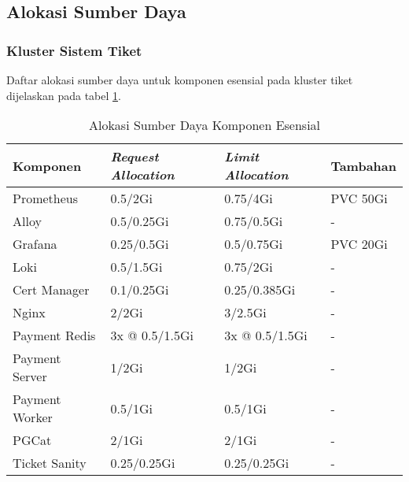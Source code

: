 \subsection{Alokasi Sumber Daya}

\subsubsection{Kluster Sistem Tiket}

Daftar alokasi sumber daya untuk komponen esensial pada kluster tiket dijelaskan pada tabel \ref{tab:resource_allocation}.

\begin{table}[htpb]
    \centering
    \caption{Alokasi Sumber Daya Komponen Esensial}
    \label{tab:resource_allocation}
    \begin{tabular}{|l|l|l|l|}
        \hline
        \textbf{Komponen} & \textbf{\textit{Request Allocation}} & \textbf{\textit{Limit Allocation}} & \textbf{Tambahan} \\ \hline
        Prometheus            & 0.5/2Gi                     & 0.75/4Gi                  & PVC 50Gi       \\ \hline
        Alloy                 & 0.5/0.25Gi                  & 0.75/0.5Gi                & -              \\ \hline
        Grafana               & 0.25/0.5Gi                  & 0.5/0.75Gi                & PVC 20Gi       \\ \hline
        Loki                  & 0.5/1.5Gi                   & 0.75/2Gi                  & -              \\ \hline
        Cert Manager          & 0.1/0.25Gi                  & 0.25/0.385Gi              & -              \\ \hline
        Nginx                 & 2/2Gi                       & 3/2.5Gi                   & -              \\ \hline
        Payment Redis         & 3x @ 0.5/1.5Gi              & 3x @ 0.5/1.5Gi            & -              \\ \hline
        Payment Server        & 1/2Gi                       & 1/2Gi                     & -              \\ \hline
        Payment Worker        & 0.5/1Gi                     & 0.5/1Gi                   & -              \\ \hline
        PGCat                 & 2/1Gi                       & 2/1Gi                     & -              \\ \hline
        Ticket Sanity         & 0.25/0.25Gi                 & 0.25/0.25Gi               & -              \\ \hline
    \end{tabular}
\end{table}

